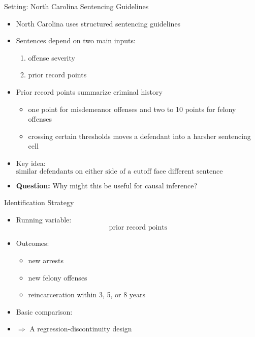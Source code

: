 \documentclass[11pt,notes=hide,aspectratio=169,mathserif]{beamer}
\begin{document}
\begin{frame}{Setting: North Carolina Sentencing Guidelines}
\begin{itemize}
\item North Carolina uses structured sentencing guidelines
\pause \item Sentences depend on two main inputs:
\begin{enumerate}
\item offense severity
\item prior record points
\end{enumerate}
\pause \item Prior record points summarize criminal history
\begin{itemize}
\item one point for misdemeanor offenses and two to 10 points for felony offenses
\item crossing certain thresholds moves a defendant into a harsher sentencing cell
\end{itemize}
\pause \item Key idea:
\[
\text{similar defendants on either side of a cutoff face different sentence recommendations}
\]
\pause \item \textbf{Question:} Why might this be useful for causal inference?
\end{itemize}
\end{frame}

\begin{frame}{Identification Strategy}
\begin{itemize}
\item Running variable:
\[
\text{prior record points}
\]
\pause \item Outcomes:
\begin{itemize}
\item new arrests
\item new felony offenses
\item reincarceration within 3, 5, or 8 years
\end{itemize}
\pause \item Basic comparison:
\pause \item $\Rightarrow$ A regression-discontinuity design
\end{itemize}
\end{frame}
\end{document}
